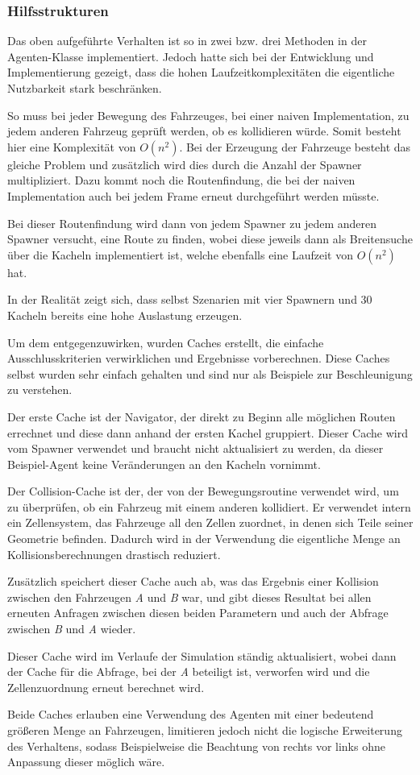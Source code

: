 \subsubsection{Hilfsstrukturen}

Das oben aufgeführte Verhalten ist so in zwei bzw. drei Methoden in der Agenten-Klasse implementiert.
Jedoch hatte sich bei der Entwicklung und Implementierung gezeigt, dass die hohen Laufzeitkomplexitäten die eigentliche Nutzbarkeit stark beschränken.

So muss bei jeder Bewegung des Fahrzeuges, bei einer naiven Implementation, zu jedem anderen Fahrzeug geprüft werden, ob es kollidieren würde.
Somit besteht hier eine Komplexität von $O(n^2)$.
Bei der Erzeugung der Fahrzeuge besteht das gleiche Problem und zusätzlich wird dies durch die Anzahl der Spawner multipliziert.
Dazu kommt noch die Routenfindung, die bei der naiven Implementation auch bei jedem Frame erneut durchgeführt werden müsste.

Bei dieser Routenfindung wird dann von jedem Spawner zu jedem anderen Spawner versucht, eine Route zu finden, wobei diese jeweils dann als Breitensuche über die Kacheln implementiert ist, welche ebenfalls eine Laufzeit von $O(n^2)$ hat.

In der Realität zeigt sich, dass selbst Szenarien mit vier Spawnern und 30 Kacheln bereits eine hohe Auslastung erzeugen.

Um dem entgegenzuwirken, wurden Caches erstellt, die einfache Ausschlusskriterien verwirklichen und Ergebnisse vorberechnen.
Diese Caches selbst wurden sehr einfach gehalten und sind nur als Beispiele zur Beschleunigung zu verstehen.

Der erste Cache ist der Navigator, der direkt zu Beginn alle möglichen Routen errechnet und diese dann anhand der ersten Kachel gruppiert.
Dieser Cache wird vom Spawner verwendet und braucht nicht aktualisiert zu werden, da dieser Beispiel-Agent keine Veränderungen an den Kacheln vornimmt.

Der Collision-Cache ist der, der von der Bewegungsroutine verwendet wird, um zu überprüfen, ob ein Fahrzeug mit einem anderen kollidiert.
Er verwendet intern ein Zellensystem, das Fahrzeuge all den Zellen zuordnet, in denen sich Teile seiner Geometrie befinden.
Dadurch wird in der Verwendung die eigentliche Menge an Kollisionsberechnungen drastisch reduziert.

Zusätzlich speichert dieser Cache auch ab, was das Ergebnis einer Kollision zwischen den Fahrzeugen \textit{A} und \textit{B} war, und gibt dieses Resultat bei allen erneuten Anfragen zwischen diesen beiden Parametern und auch der Abfrage zwischen \textit{B} und \textit{A} wieder.

Dieser Cache wird im Verlaufe der Simulation ständig aktualisiert, wobei dann der Cache für die Abfrage, bei der \textit{A} beteiligt ist, verworfen wird und die Zellenzuordnung erneut berechnet wird.

Beide Caches erlauben eine Verwendung des Agenten mit einer bedeutend größeren Menge an Fahrzeugen, limitieren jedoch nicht die logische Erweiterung des Verhaltens, sodass Beispielweise die Beachtung von rechts vor links ohne Anpassung dieser möglich wäre.


